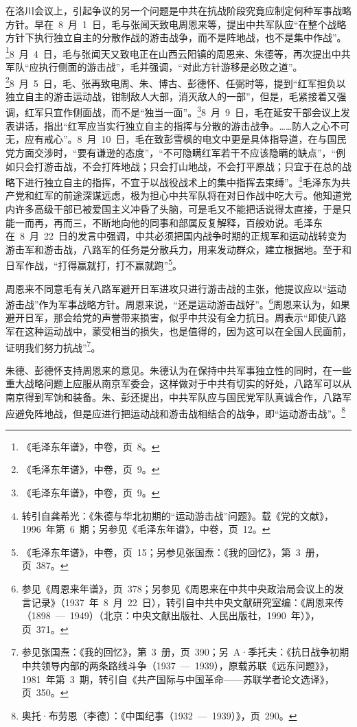在洛川会议上，引起争议的另一个问题是中共在抗战阶段究竟应制定何种军事战略方针。早在~8~月~1~日，毛与张闻天致电周恩来等，提出中共军队应“在整个战略方针下执行独立自主的分散作战的游击战争，而不是阵地战，也不是集中作战”。\footnote{《毛泽东年谱》，中卷，页~8。}8~月~4~日，毛与张闻天又致电正在山西云阳镇的周恩来、朱德等，再次提出中共军队“应执行侧面的游击战”，毛并强调，“对此方针游移是必败之道”。\footnote{《毛泽东年谱》，中卷，页~9。}8~月~5~日，毛、张再致电周、朱、博古、彭德怀、任弼时等，提到“红军担负以独立自主的游击运动战，钳制敌人大部，消灭敌人的一部”，但是，毛紧接着又强调，红军只宜作侧面战，而不是“独当一面”。\footnote{《毛泽东年谱》，中卷，页~9。}8~月~9~日，毛在延安干部会议上发表讲话，指出“红军应当实行独立自主的指挥与分散的游击战争。……防人之心不可无，应有戒心”。8~月~10~日，毛在致彭雪枫的电文中更是具体指导道，在与国民党方面交涉时，“要有谦逊的态度”，“不可隐瞒红军若干不应该隐瞒的缺点”，“例如只会打游击战，不会打阵地战；只会打山地战，不会打平原战；只宜于在总的战略下进行独立自主的指挥，不宜于以战役战术上的集中指挥去束缚”。\footnote{转引自龚希光：《朱德与华北初期的“运动游击战”问题》。载《党的文献》，1996~年第~6~期；另参见《毛泽东年谱》，中卷，页~12。}毛泽东为共产党和红军的前途深谋远虑，极为担心中共军队将在对日作战中吃大亏。他知道党内许多高级干部已被爱国主义冲昏了头脑，可是毛又不能把话说得太直接，于是只能一而再，再而三，不断地向他的同事和部属反复解释，百般劝说。毛泽东在~8~月~22~日的发言中强调，中共必须把国内战争时期的正规军和运动战转变为游击军和游击战，八路军的任务是分散兵力，用来发动群众，建立根据地。至于和日军作战，“打得赢就打，打不赢就跑”\footnote{《毛泽东年谱》，中卷，页~15；另参见张国焘：《我的回忆》，第~3~册，页~387。}。

周恩来不同意毛有关八路军避开日军进攻只进行游击战的主张，他提议应以“运动游击战”作为军事战略方针。周恩来说，“还是运动游击战好”。\footnote{参见《周恩来年谱》，页~378；另参见《周恩来在中共中央政治局会议上的发言记录》（1937~年~8~月~22~日），转引自中共中央文献研究室编：《周恩来传（1898~—~1949）（北京：中央文献出版社、人民出版社，1990~年）》，页~371。}周恩来认为，如果避开日军，那会给党的声誉带来损害，似乎中共没有全力抗日。周表示“即使八路军在这种运动战中，蒙受相当的损失，也是值得的，因为这可以在全国人民面前，证明我们努力抗战”\footnote{参见张国焘：《我的回忆》，第~3~册，页~390；另~A·季托夫：《抗日战争初期中共领导内部的两条路线斗争（1937~—~1939），原载苏联《远东问题》》，1981~年第~3~期，转引自《共产国际与中国革命——苏联学者论文选译》，页~350。}。

朱德、彭德怀支持周恩来的意见。朱德认为在保持中共军事独立性的同时，在一些重大战略问题上应服从南京军委会，这样做对于中共有切实的好处，八路军可以从南京得到军饷和装备。朱、彭还提出，中共军队应与国民党军队真诚合作，八路军应避免阵地战，但是应进行把运动战和游击战相结合的战争，即“运动游击战”。\footnote{奥托·布劳恩（李德）：《中国纪事（1932~—~1939）》，页~290。}

